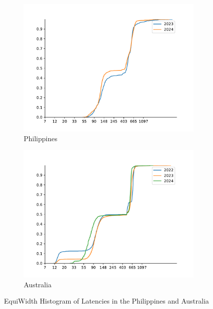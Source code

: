 \begin{figure}
	\centering
	\begin{subfigure}[b]{0.8\linewidth}
		\includegraphics[width=\linewidth]{chapters/4-results/latency/img/cdf_latencies_of_starlink_probes_in_philippines.pdf}
		\caption{Philippines}
	\end{subfigure}
	\begin{subfigure}[b]{0.8\linewidth}
		\includegraphics[width=\linewidth]{chapters/4-results/latency/img/cdf_latencies_of_starlink_probes_in_australia.pdf}
		\caption{Australia}
	\end{subfigure}
	\caption{EquiWidth Histogram of Latencies in the Philippines and
		Australia}
	\label{fig:latency-cdf-7}
\end{figure}

